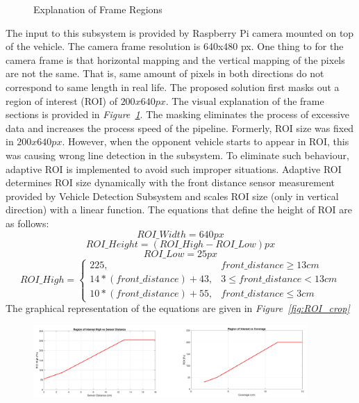 \documentclass[a4paper,12pt]{article}
\begin{document}
\begin{enumerate}[A.]
\begin{figure}[t]
	\caption{Explanation of Frame Regions}\label{fig:explanation_ROI_ROT}
	
\end{figure}

The input to this subsystem is provided by Raspberry Pi camera mounted on top of the vehicle. The camera frame resolution is 640x480 px. One thing to for the camera frame is that horizontal mapping and the vertical mapping of the pixels are not the same. That is, same amount of pixels in both directions do not correspond to same length in real life. The proposed solution first masks out a region of interest (ROI) of $200x640 px$. The visual explanation of the frame sections is provided in \textit{Figure~\ref{fig:explanation_ROI_ROT}}. The masking eliminates the process of excessive data and increases the process speed of the pipeline. Formerly, ROI size was fixed in $200x640 px$. However, when the opponent vehicle starts to appear in ROI, this was causing wrong line detection in the subsystem. To eliminate such behaviour, adaptive ROI is implemented to avoid such improper situations. Adaptive ROI determines ROI size dynamically with the front distance sensor measurement provided by Vehicle Detection Subsystem and scales ROI size (only in vertical direction) with a linear function. The equations that define the height of ROI are as follows:
\begin{equation}
	ROI\_Width = 640 px
\end{equation}
\begin{equation}
	ROI\_Height = (ROI\_High - ROI\_Low) px
\end{equation}
\begin{equation}
	ROI\_Low = 25 px
\end{equation}
\begin{equation}
	ROI\_High =
		\begin{cases}
		225, & front\_distance \geq 13 cm \\
		14*(front\_distance) + 43, &3\leq front\_distance <  13 cm \\
		10*(front\_distance) + 55, & front\_distance \leq 3 cm
		\end{cases}
\end{equation}
The graphical representation of the equations are given in \textit{Figure~\ref{fig:ROI_crop}}

\begin{figure}[t]
	
	\includegraphics[width=0.93\textwidth,center]{images/ROT_ROI/ROI_crop}
	

\end{figure}
\end{enumerate}
\end{document}
